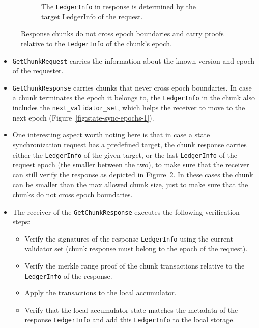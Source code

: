 \documentclass[letterpaper,10pt]{article}
\begin{document}
\begin{figure}[ht]
\begin{subfigure}{0.47\textwidth}
        \caption{\footnotesize{The \texttt{LedgerInfo} in response is determined by the target LedgerInfo of the request.}}
        \label{fig:state-sync-epochs-2}
    \end{subfigure}
    \caption{\footnotesize{Response chunks do not cross epoch boundaries and carry proofs relative to the \texttt{LedgerInfo} of the chunk's epoch.}}
    \label{fig:state-sync-epochs}
\end{figure}

\begin{itemize}
\item \texttt{GetChunkRequest} carries the information about the known version and epoch of the requester.
\item \texttt{GetChunkResponse} carries chunks that never cross epoch boundaries. In case a chunk terminates the epoch it belongs to, the \texttt{LedgerInfo} in the chunk also includes the \texttt{next\_validator\_set}, which helps the receiver to move to the next epoch (Figure~\ref{fig:state-sync-epochs-1}).
\item One interesting aspect worth noting here is that in case a state synchronization request has a predefined target, the chunk response carries either the \texttt{LedgerInfo} of the given target, or the last \texttt{LedgerInfo} of the request epoch (the smaller between the two), to make sure that the receiver can still verify the response as depicted in Figure~\ref{fig:state-sync-epochs}. In these cases the chunk can be smaller than the max allowed chunk size, just to make sure that the chunks do not cross epoch boundaries.
\item The receiver of the \texttt{GetChunkResponse} executes the following verification steps:
\begin{itemize}
\item Verify the signatures of the response \texttt{LedgerInfo} using the current validator set (chunk response must belong to the epoch of the request).
\item Verify the merkle range proof of the chunk transactions relative to the \texttt{LedgerInfo} of the response.
\item Apply the transactions to the local accumulator.
\item Verify that the local accumulator state matches the metadata of the response \texttt{LedgerInfo} and add this \texttt{LedgerInfo} to the local storage.
\end{itemize}
\end{itemize}
\end{document}
